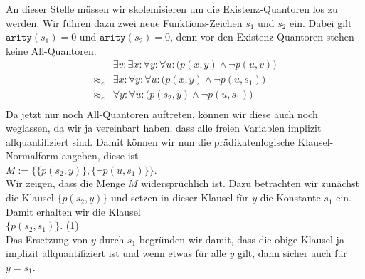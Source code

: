 An dieser Stelle m\"{u}ssen wir skolemisieren um die Existenz-Quantoren los zu werden. 
Wir f\"{u}hren dazu zwei neue Funktions-Zeichen $s_1$ und $s_2$ ein. 
Dabei gilt $\mathtt{arity}(s_1) = 0$ und $\mathtt{arity}(s_2) = 0$, denn vor den
Existenz-Quantoren stehen keine All-Quantoren.
$$
\begin{array}{ll}
           & \exists v\colon  \exists x\colon \forall y\colon \forall u\colon \Big( p(x,y) \wedge \neg p(u,v) \Big)\\
 \approx_e & \exists x\colon \forall y\colon \forall u\colon \Big( p(x,y) \wedge \neg p(u,s_1) \Big)\\
 \approx_e & \forall y\colon \forall u\colon \Big( p(s_2,y) \wedge \neg p(u,s_1) \Big)\\
\end{array}
$$
Da jetzt nur noch All-Quantoren auftreten, k\"{o}nnen wir diese auch noch weglassen,
da wir ja vereinbart haben, dass alle freien Variablen implizit allquantifiziert sind.
Damit k\"{o}nnen wir nun die pr\"{a}dikatenlogische Klausel-Normalform angeben, diese ist\\[0.2cm]
\hspace*{1.3cm}
$M := \Big\{ \big\{ p(s_2,y) \big\}, \big\{\neg p(u,s_1)\big\}\Big\}$. \\[0.2cm]
Wir zeigen, dass die Menge $M$ widerspr\"{u}chlich ist.
Dazu betrachten wir zun\"{a}chst die Klausel $\big\{ p(s_2,y) \big\}$ und setzen in
dieser Klausel f\"{u}r $y$ die Konstante $s_1$ ein.  Damit erhalten wir die Klausel \\[0.2cm]
\hspace*{1.3cm}  $\big\{ p(s_2,s_1) \big\}$. \hspace*{\fill}(1)\\[0.2cm]
Das Ersetzung von $y$ durch $s_1$ begr\"{u}nden wir damit, dass die obige Klausel ja implizit
allquantifiziert ist und wenn etwas f\"{u}r alle $y$ gilt, dann sicher auch f\"{u}r $y = s_1$.

